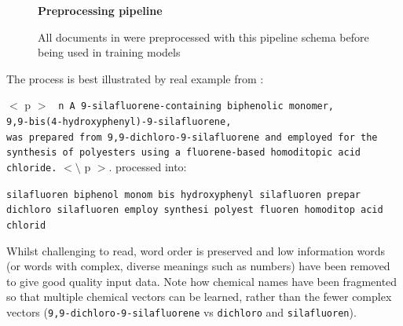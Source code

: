 \begin{figure}[H]
    \centering
    \textbf{Preprocessing pipeline}\par\medskip
    \caption[Preprocessing Pipeline]{All documents in  were preprocessed with this pipeline schema before being used in training models}
     \label{fig:SANPIPE}
\end{figure}
The process is best illustrated by real example from :

$<$ p $>$
\texttt{ n A 9-silafluorene-containing biphenolic monomer,\\ 9,9-bis(4-hydroxyphenyl)-9-silafluorene, \\ was prepared from 9,9-dichloro-9-silafluorene and employed for the synthesis of polyesters using a fluorene-based homoditopic acid chloride.} $< \setminus$ p $>$.
\cite{sanex} 
processed into:

\texttt{silafluoren biphenol monom bis hydroxyphenyl silafluoren prepar dichloro silafluoren employ synthesi polyest fluoren homoditop acid chlorid}

Whilst challenging to read, word order is preserved and low information words (or words with complex, diverse meanings such as numbers) have been removed to give good quality input data. Note how chemical names have been fragmented so that multiple chemical vectors can be learned, rather than the fewer complex vectors (\texttt{9,9-dichloro-9-silafluorene} vs \texttt{dichloro} and \texttt{silafluoren}).

